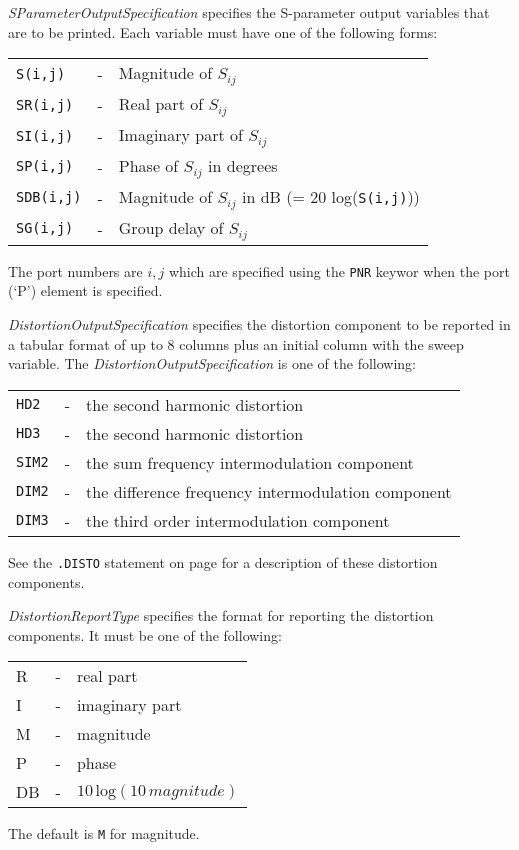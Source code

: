 \begin{widelist}
\item[{\it SParameterOutputSpecification}]
      specifies the S-parameter output variables that are to be printed.
      Each variable must have one of the following forms:\\
      \offset\begin{tabular}{lcp{3.5in}}
      {\tt S(i,j)} &-&Magnitude of $S_{ij}$\\
      {\tt SR(i,j)} &-&Real part of $S_{ij}$\\
      {\tt SI(i,j)} &-&Imaginary part of $S_{ij}$\\
      {\tt SP(i,j)} &-&Phase of $S_{ij}$ in degrees\\
      {\tt SDB(i,j)} &-&Magnitude of $S_{ij}$ in dB
                         (= 20 log({\tt {\tt S(i,j)}}))\\ 
      {\tt SG(i,j)} &-&Group delay of $S_{ij}$
      \end{tabular}
      The port numbers are $i,j$  which are specified using the {\tt PNR} keywor
      when the port (`P') element is specified.


{
\item[{\it DistortionOutputSpecification}]
     specifies the distortion component to be reported
     in a tabular format of up to 8 columns plus an initial column with the sweep
     variable.  The {\it DistortionOutputSpecification} is one of the
     following:\\
      \offset\begin{tabular}{lcp{3.5in}}
      {\tt HD2} &-&the second harmonic distortion\\
      {\tt HD3} &-&the second harmonic distortion\\
      {\tt SIM2} &-&the sum frequency intermodulation component\\
      {\tt DIM2} &-&the difference frequency intermodulation component\\
      {\tt DIM3} &-&the third order intermodulation component
      \end{tabular}
      See the {\tt .DISTO} statement on page \pageref{.DISTOstatement} for
      a description of these distortion components.

\item[{\it DistortionReportType }]
     specifies the format for reporting the distortion components.
     It  must be one of the
     following:\\
      \offset\begin{tabular}{lcp{3.5in}}
      R &-&real part\\
      I &-&imaginary part\\
      M &-&magnitude\\
      P &-&phase\\
      DB &-&$10\,\mbox{log}(10\,magnitude)$
      \end{tabular}
      The default is {\tt M} for magnitude.
}
\end{widelist}

